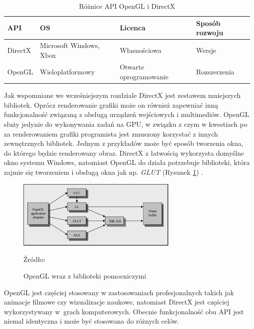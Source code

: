 \documentclass[archive]{mgr}
\begin{document}
\begin{table}[h!]

    \centering %
    \caption{Różnice API OpenGL i DirectX}
    		\label{lab:APIdiff}
    \vspace{2mm} %
\begin{tabular}{|l|l|l|l|}
\hline
\textbf{API} & \textbf{OS} & \textbf{Licenca}& \textbf{Sposób rozwoju} \\ \hline
DirectX & Microsoft Windows, Xbox & Własnościowa & Wersje \\ \hline
OpenGL & Wieloplatformowy & Otwarte oprogramowanie & Rozszerzenia \\ \hline
\end{tabular}
\end{table}

Jak wspomniane we wcześniejszym rozdziale DirectX jest zestawem mniejszych bibliotek. Oprócz renderowanie grafiki może on również zapewniać inną funkcjonalność związaną z obsługą urządzeń wejściowych i multimediów. OpenGL służy jedynie do wykonywania zadań na GPU, w związku z czym w kwestiach po za renderowaniem grafiki programista jest zmuszony korzystać z innych zewnętrznych bibliotek. Jednym z przykładów może być sposób tworzenia okna, do którego będzie renderowany obraz. DirectX z łatwością wykorzysta domyślne okno systemu Windows, natomiast OpenGL do działa potrzebuje biblioteki, która zajmie się tworzeniem i obsługą okna jak np. \emph{GLUT} (Rysunek \ref{lab:opengllib}) \cite{compar}.

\begin{figure}[h!]
  \centering
    \includegraphics[width=0.70\textwidth]{images/glut.png}
   \caption{OpenGL wraz z biblioteki pomocniczymi}
   Źródło:  \cite{compar}
   \label{lab:opengllib}
\end{figure}

OpenGL jest częściej stosowany w zastosowaniach profesjonalnych takich jak animacje filmowe czy wizualizacje naukowe, natomiast DirectX jest częściej wykorzystywany w~grach komputerowych. Obecnie funkcjonalność obu API jest niemal identyczna i może być stosowana do różnych celów.
\end{document}

